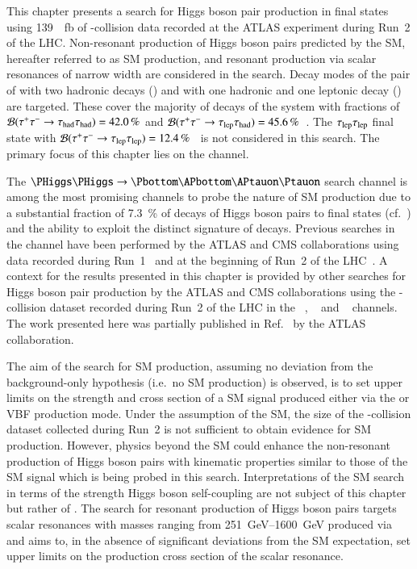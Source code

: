 This chapter presents a search for Higgs boson pair production in
\bbtautau final states using \SI{139}{\per\femto\barn} of
\pp-collision data recorded at the ATLAS experiment during Run~2 of
the LHC. Non-resonant production of Higgs boson pairs predicted by the
SM, hereafter referred to as SM \HH production, and resonant
production via scalar resonances of narrow width are considered in the
search. Decay modes of the pair of \tauleptons with two hadronic
\taulepton decays (\hadhad) and with one hadronic and one leptonic
\taulepton decay (\lephad) are targeted. These cover the majority of
decays of the \tautau system with fractions of
$\mathcal{B}(\tau^{+} \tau^{-} \to \tau_{\text{had}}\tau_{\text{had}}) = \SI{42.0}{\percent}$ and
$\mathcal{B}(\tau^{+} \tau^{-} \to \tau_{\text{lep}}\tau_{\text{had}}) =
\SI{45.6}{\percent}$~\cite{Zyla:2020zbs}. The $\tau_{\text{lep}}\tau_{\text{lep}}$ final
state with
$\mathcal{B}(\tau^{+} \tau^{-} \to \tau_{\text{lep}}\tau_{\text{lep}}) =
\SI{12.4}{\percent}$~\cite{Zyla:2020zbs} is not considered in this
search. The primary focus of this chapter lies on the \hadhad channel.

The $\HH \to \bbtautau$ search channel is among the most promising
channels to probe the nature of SM \HH production due to a substantial
fraction of \SI{7.3}{\percent} of decays of Higgs boson pairs to
\bbtautau final states (cf.~) and the
ability to exploit the distinct signature of \taulepton
decays. Previous searches in the \bbtautau channel have been performed
by the ATLAS and CMS collaborations using data recorded during
Run~1~\cite{HIGG-2013-33,CMS-HIG-15-013} and at the beginning of Run~2
of the LHC~\cite{HIGG-2016-16-witherratum,CMS-HIG-17-002}. A context
for the results presented in this chapter is provided by other
searches for Higgs boson pair production by the ATLAS and CMS
collaborations using the \pp-collision dataset recorded during Run~2
of the LHC in the \bbtautau~\cite{CMS-PAS-HIG-20-010},
\bbbb~\cite{ATLAS-CONF-2022-035,CMS-HIG-20-005} and
\bbyy~\cite{HDBS-2018-34,CMS-HIG-19-018} channels. The work presented
here was partially published in Ref.~\cite{ATLAS-CONF-2021-030} by the
ATLAS collaboration.

The aim of the search for SM \HH production, assuming no deviation
from the background-only hypothesis (i.e.\ no SM \HH production) is
observed, is to set upper limits on the strength and cross section of
a SM \HH signal produced either via the \ggF or VBF production
mode. Under the assumption of the SM, the size of the \pp-collision
dataset collected during Run~2 is not sufficient to obtain evidence
for SM \HH production. However, physics beyond the SM could enhance
the non-resonant production of Higgs boson pairs with kinematic
properties similar to those of the SM \HH signal which is being probed
in this search. Interpretations of the SM \HH search in terms of the
strength Higgs boson self-coupling are not subject of this chapter but
rather of . The search for resonant
production of Higgs boson pairs targets scalar resonances with masses
ranging from \SIrange{251}{1600}{\GeV} produced via \ggF and aims to,
in the absence of significant deviations from the SM expectation, set
upper limits on the production cross section of the scalar resonance.

